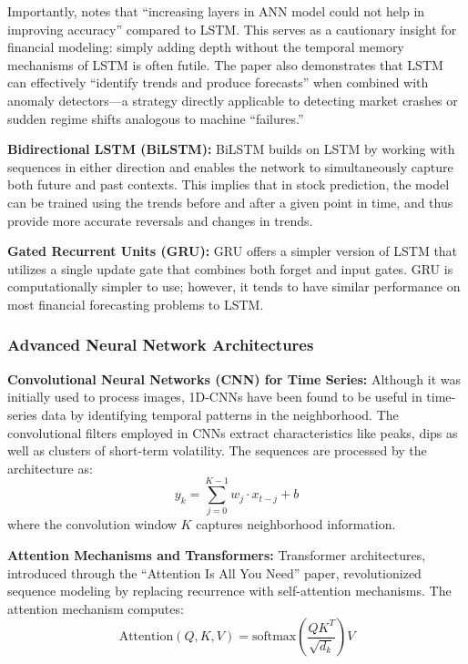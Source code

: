 Importantly, \cite{machinefailure2024} notes that ``increasing layers in ANN model could not help in improving accuracy'' compared to LSTM. This serves as a cautionary insight for financial modeling: simply adding depth without the temporal memory mechanisms of LSTM is often futile. The paper also demonstrates that LSTM can effectively ``identify trends and produce forecasts'' when combined with anomaly detectors---a strategy directly applicable to detecting market crashes or sudden regime shifts analogous to machine ``failures.''

\textbf{Bidirectional LSTM (BiLSTM):}
BiLSTM builds on LSTM by working with sequences in either direction and enables the network to simultaneously capture both future and past contexts. This implies that in stock prediction, the model can be trained using the trends before and after a given point in time, and thus provide more accurate reversals and changes in trends.


\textbf{Gated Recurrent Units (GRU):}
GRU offers a simpler version of LSTM that utilizes a single update gate that combines both forget and input gates. GRU is computationally simpler to use; however, it tends to have similar performance on most financial forecasting problems to LSTM.

\subsubsection{Advanced Neural Network Architectures}

\textbf{Convolutional Neural Networks (CNN) for Time Series:}
Although it was initially used to process images, 1D-CNNs have been found to be useful in time-series data by identifying temporal patterns in the neighborhood. The convolutional filters employed in CNNs extract characteristics like peaks, dips as well as clusters of short-term volatility. The sequences are processed by the architecture as:
\begin{equation}
y_k = \sum_{j=0}^{K-1} w_j \cdot x_{t-j} + b
\end{equation}
where the convolution window $K$ captures neighborhood information.

\textbf{Attention Mechanisms and Transformers:}
Transformer architectures, introduced through the ``Attention Is All You Need'' paper, revolutionized sequence modeling by replacing recurrence with self-attention mechanisms. The attention mechanism computes:
\begin{equation}
\text{Attention}(Q, K, V) = \text{softmax}\left(\frac{QK^T}{\sqrt{d_k}}\right)V
\end{equation}

